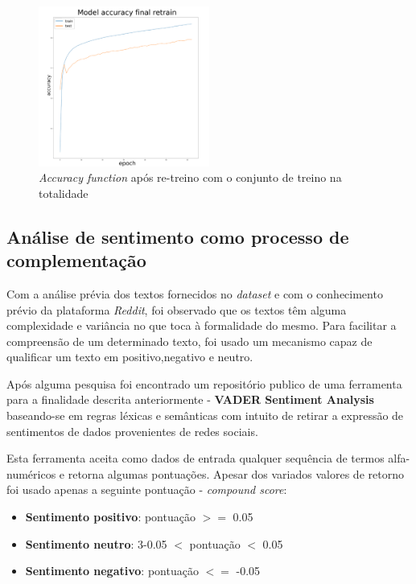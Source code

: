 \begin{figure}[t]
\begin{center}
\includegraphics[width=0.5\textwidth,keepaspectratio]{figures/last_retrain_better.png}
\caption{\textit{Accuracy function} após re-treino com o conjunto de treino na totalidade}
\label{diagram:accuracy_retrain_last}
\centering
\end{center}
\end{figure}

\subsection{Análise de sentimento como processo de complementação}

Com a análise prévia dos textos fornecidos no \textit{dataset} e com o conhecimento prévio da plataforma \textit{Reddit}, foi observado que os textos têm alguma complexidade e variância no que toca à formalidade do mesmo.
Para facilitar a compreensão de um determinado texto, foi usado um mecanismo capaz de qualificar um texto em positivo,negativo e neutro.

Após alguma pesquisa foi encontrado um repositório publico de uma ferramenta para a finalidade descrita anteriormente - \textbf{VADER Sentiment Analysis} \cite{vader} baseando-se em regras léxicas e semânticas com intuito de retirar a expressão de sentimentos de dados provenientes de redes sociais.

Esta ferramenta aceita como dados de entrada qualquer sequência de termos alfa-numéricos e retorna algumas pontuações. Apesar dos variados valores de retorno foi usado apenas a seguinte pontuação - \textit{compound score}:
\begin{itemize}
    \item \textbf{Sentimento positivo}: pontuação $>=$ 0.05
    \item \textbf{Sentimento neutro}: 3-0.05 $<$ pontuação $<$ 0.05
    \item \textbf{Sentimento negativo}: pontuação $<=$ -0.05
\end{itemize}

